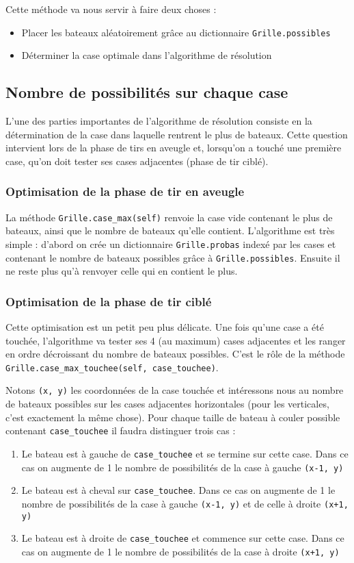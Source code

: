 Cette méthode va nous servir à faire deux choses :
\begin{itemize}
\item Placer les bateaux aléatoirement grâce au dictionnaire \texttt{Grille.possibles}
\item Déterminer la case optimale dans l'algorithme de résolution
\end{itemize}

\subsection{Nombre de possibilités sur chaque case}
L'une des parties importantes de l'algorithme de résolution consiste en la détermination de la case dans laquelle rentrent le plus de bateaux. Cette question intervient lors de la phase de tirs en aveugle et, lorsqu'on a touché une première case, qu'on doit tester ses cases adjacentes (phase de tir ciblé).
\subsubsection{Optimisation de la phase de tir en aveugle}\label{opti_aveugle}
La méthode \texttt{Grille.case\_max(self)} renvoie la case vide contenant le plus de bateaux, ainsi que le nombre de bateaux qu'elle contient. L'algorithme est très simple : d'abord on crée un dictionnaire \texttt{Grille.probas} indexé par les cases et contenant le nombre de bateaux possibles grâce à \texttt{Grille.possibles}. Ensuite il ne reste plus qu'à renvoyer celle qui en contient le plus.

\subsubsection{Optimisation de la phase de tir ciblé}\label{opti_touche}
Cette optimisation est un petit peu plus délicate. Une fois qu'une case a été touchée, l'algorithme va tester ses 4 (au maximum) cases adjacentes et les ranger en ordre décroissant du nombre de bateaux possibles. C'est le rôle de la méthode \texttt{Grille.case\_max\_touchee(self, case\_touchee)}. 

Notons \texttt{(x, y)} les coordonnées de la case touchée et intéressons nous au nombre de bateaux possibles sur les cases adjacentes horizontales (pour les verticales, c'est exactement la même chose). Pour chaque taille de bateau à couler possible contenant \texttt{case\_touchee} il faudra distinguer trois cas :
\begin{enumerate}
\item Le bateau est à gauche de \texttt{case\_touchee} et se termine sur cette case. Dans ce cas on augmente de 1 le nombre de possibilités de la case à gauche \texttt{(x-1, y)}
\item Le bateau est à cheval sur \texttt{case\_touchee}. Dans ce cas on augmente de 1 le nombre de possibilités de la case à gauche \texttt{(x-1, y)} et de celle à droite \texttt{(x+1, y)}
\item Le bateau est à droite de \texttt{case\_touchee} et commence sur cette case. Dans ce cas on augmente de 1 le nombre de possibilités de la case à droite \texttt{(x+1, y)}
\end{enumerate}

